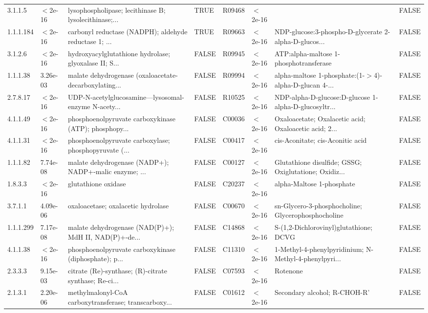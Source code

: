 \documentclass{article}\usepackage[]{graphicx}\usepackage[]{color}
\begin{document}
{{\begin{tabular}{llllllll}
  3.1.1.5 & $<$2e-16 & lysophospholipase; lecithinase B; lysolecithinase;... & TRUE & R09468 & $<$2e-16 &  & FALSE \\ 
  1.1.1.184 & $<$2e-16 & carbonyl reductase (NADPH); aldehyde reductase 1; ... & TRUE & R09663 & $<$2e-16 & NDP-glucose:3-phospho-D-glycerate 2-alpha-D-glucos... & FALSE \\ 
  3.1.2.6 & $<$2e-16 & hydroxyacylglutathione hydrolase; glyoxalase II; S... & FALSE & R09945 & $<$2e-16 & ATP:alpha-maltose 1-phosphotransferase & FALSE \\ 
  1.1.1.38 &  3.26e-03 & malate dehydrogenase (oxaloacetate-decarboxylating... & FALSE & R09994 & $<$2e-16 & alpha-maltose 1-phosphate:(1-$>$4)-alpha-D-glucan 4-... & FALSE \\ 
  2.7.8.17 & $<$2e-16 & UDP-N-acetylglucosamine---lysosomal-enzyme N-acety... & FALSE & R10525 & $<$2e-16 & NDP-alpha-D-glucose:D-glucose 1-alpha-D-glucosyltr... & FALSE \\ 
  4.1.1.49 & $<$2e-16 & phosphoenolpyruvate carboxykinase (ATP); phosphopy... & FALSE & C00036 & $<$2e-16 & Oxaloacetate; Oxalacetic acid; Oxaloacetic acid; 2... & FALSE \\ 
  4.1.1.31 & $<$2e-16 & phosphoenolpyruvate carboxylase; phosphopyruvate (... & FALSE & C00417 & $<$2e-16 & cis-Aconitate; cis-Aconitic acid & FALSE \\ 
  1.1.1.82 &  7.74e-08 & malate dehydrogenase (NADP+); NADP+-malic enzyme; ... & FALSE & C00127 & $<$2e-16 & Glutathione disulfide; GSSG; Oxiglutatione; Oxidiz... & FALSE \\ 
  1.8.3.3 & $<$2e-16 & glutathione oxidase & FALSE & C20237 & $<$2e-16 & alpha-Maltose 1-phosphate & FALSE \\ 
  3.7.1.1 &  4.09e-06 & oxaloacetase; oxalacetic hydrolase & FALSE & C00670 & $<$2e-16 & sn-Glycero-3-phosphocholine; Glycerophosphocholine & FALSE \\ 
  1.1.1.299 &  7.17e-08 & malate dehydrogenase (NAD(P)+); MdH II, NAD(P)+-de... & FALSE & C14868 & $<$2e-16 & S-(1,2-Dichlorovinyl)glutathione; DCVG & FALSE \\ 
  4.1.1.38 & $<$2e-16 & phosphoenolpyruvate carboxykinase (diphosphate); p... & FALSE & C11310 & $<$2e-16 & 1-Methyl-4-phenylpyridinium; N-Methyl-4-phenylpyri... & FALSE \\ 
  2.3.3.3 &  9.15e-03 & citrate (Re)-synthase; (R)-citrate synthase; Re-ci... & FALSE & C07593 & $<$2e-16 & Rotenone & FALSE \\ 
  2.1.3.1 &  2.20e-06 & methylmalonyl-CoA carboxytransferase; transcarboxy... & FALSE & C01612 & $<$2e-16 & Secondary alcohol; R-CHOH-R' & FALSE \\ 

\end{tabular}}}
\end{document}
